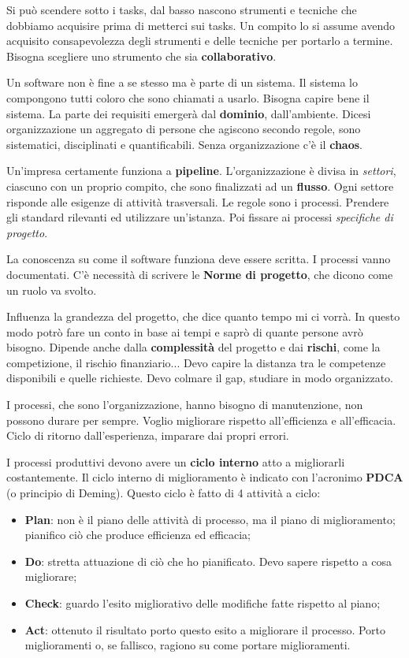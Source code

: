 Si può scendere sotto i tasks, dal basso nascono strumenti e tecniche che dobbiamo acquisire prima di metterci sui tasks. Un compito lo si assume avendo acquisito consapevolezza degli strumenti e delle tecniche per portarlo a termine. Bisogna scegliere uno strumento che sia \textbf{collaborativo}.

Un software non è fine a se stesso ma è parte di un sistema. Il sistema lo compongono tutti coloro che sono chiamati a usarlo. Bisogna capire bene il sistema. La parte dei requisiti emergerà dal \textbf{dominio}, dall'ambiente. Dicesi organizzazione un aggregato di persone che agiscono secondo regole, sono sistematici, disciplinati e quantificabili. Senza organizzazione c'è il \textbf{chaos}.

Un'impresa certamente funziona a \textbf{pipeline}. L'organizzazione è divisa in \textit{settori}, ciascuno con un proprio compito, che sono finalizzati ad un \textbf{flusso}. Ogni settore risponde alle esigenze di attività trasversali. Le regole sono i processi. Prendere gli standard rilevanti ed utilizzare un'istanza. Poi fissare ai processi \textit{specifiche di progetto}. 

La conoscenza su come il software funziona deve essere scritta. I processi vanno documentati. C'è necessità di scrivere le \textbf{Norme di progetto}, che dicono come un ruolo va svolto.

Influenza la grandezza del progetto, che dice quanto tempo mi ci vorrà. In questo modo potrò fare un conto in base ai tempi e saprò di quante persone avrò bisogno. Dipende anche dalla \textbf{complessità} del progetto e dai \textbf{rischi}, come la competizione, il rischio finanziario... Devo capire la distanza tra le competenze disponibili e quelle richieste. Devo colmare il gap, studiare in modo organizzato.

I processi, che sono l'organizzazione, hanno bisogno di manutenzione, non possono durare per sempre. Voglio migliorare rispetto all'efficienza e all'efficacia. Ciclo di ritorno dall'esperienza, imparare dai propri errori.

I processi produttivi devono avere un \textbf{ciclo interno} atto a migliorarli costantemente. Il ciclo interno di miglioramento è indicato con l'acronimo \textbf{PDCA} (o principio di Deming). Questo ciclo è fatto di 4 attività a ciclo:

\begin{itemize}

	\item \textbf{Plan}: non è il piano delle attività di processo, ma il piano di miglioramento; pianifico ciò che produce efficienza ed efficacia;
	\item \textbf{Do}: stretta attuazione di ciò che ho pianificato. Devo sapere rispetto a cosa migliorare;
	\item \textbf{Check}: guardo l'esito migliorativo delle modifiche fatte rispetto al piano;
	\item \textbf{Act}: ottenuto il risultato porto questo esito a migliorare il processo. Porto miglioramenti o, se fallisco, ragiono su come portare miglioramenti.

\end{itemize}

